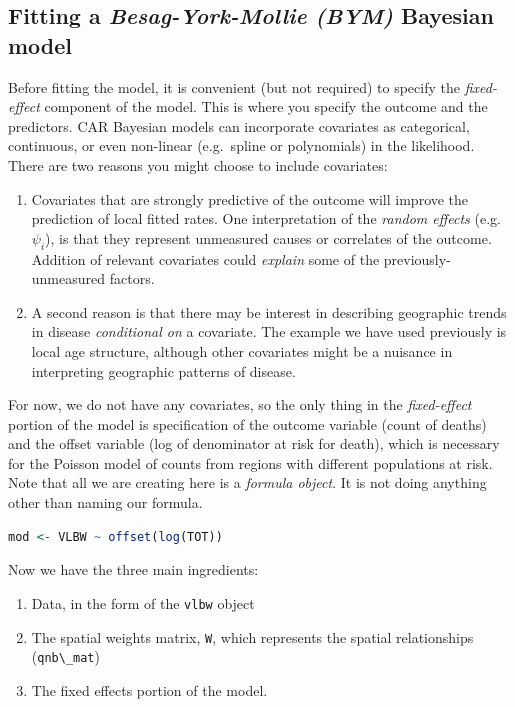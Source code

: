 \documentclass[
]{book}
\newcommand{\passthrough}[1]{#1}
\providecommand{\tightlist}{%
  \setlength{\itemsep}{0pt}\setlength{\parskip}{0pt}}
\begin{document}
\hypertarget{fitting-a-besag-york-mollie-bym-bayesian-model}{%
\subsection{\texorpdfstring{Fitting a \emph{Besag-York-Mollie (BYM)} Bayesian model}{Fitting a Besag-York-Mollie (BYM) Bayesian model}}\label{fitting-a-besag-york-mollie-bym-bayesian-model}}

Before fitting the model, it is convenient (but not required) to specify the \emph{fixed-effect} component of the model. This is where you specify the outcome and the predictors. CAR Bayesian models can incorporate covariates as categorical, continuous, or even non-linear (e.g.~spline or polynomials) in the likelihood. There are two reasons you might choose to include covariates:

\begin{enumerate}
\def\labelenumi{\arabic{enumi}.}
\tightlist
\item
  Covariates that are strongly predictive of the outcome will improve the prediction of local fitted rates. One interpretation of the \emph{random effects} (e.g.~\(\psi_i\)), is that they represent unmeasured causes or correlates of the outcome. Addition of relevant covariates could \emph{explain} some of the previously-unmeasured factors.
\item
  A second reason is that there may be interest in describing geographic trends in disease \emph{conditional on} a covariate. The example we have used previously is local age structure, although other covariates might be a nuisance in interpreting geographic patterns of disease.
\end{enumerate}

For now, we do not have any covariates, so the only thing in the \emph{fixed-effect} portion of the model is specification of the outcome variable (count of deaths) and the offset variable (log of denominator at risk for death), which is necessary for the Poisson model of counts from regions with different populations at risk. Note that all we are creating here is a \emph{formula object}. It is not doing anything other than naming our formula.

\begin{lstlisting}[language=R]
mod <- VLBW ~ offset(log(TOT))
\end{lstlisting}

Now we have the three main ingredients:

\begin{enumerate}
\def\labelenumi{\arabic{enumi}.}
\tightlist
\item
  Data, in the form of the \passthrough{\lstinline!vlbw!} object
\item
  The spatial weights matrix, \passthrough{\lstinline!W!}, which represents the spatial relationships (\passthrough{\lstinline!qnb\_mat!})
\item
  The fixed effects portion of the model.
\end{enumerate}
\end{document}
